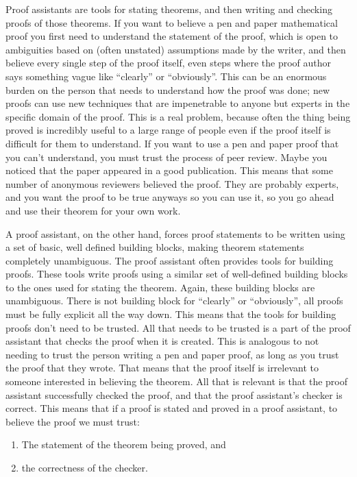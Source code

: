 \documentclass{puthesis}
\begin{document}
Proof assistants are tools for stating theorems, and then writing and
checking proofs of those theorems. If you want to believe a pen and
paper mathematical proof you first need to understand the statement of
the proof, which is open to ambiguities based on (often unstated)
assumptions made by the writer, and then believe every single step of
the proof itself, even steps where the proof author says something
vague like ``clearly'' or ``obviously''. This can be an enormous
burden on the person that needs to understand how the proof was done;
new proofs can use new techniques that are impenetrable to anyone but
experts in the specific domain of the proof. This is a real problem,
because often the thing being proved is incredibly useful to a large
range of people even if the proof itself is difficult for them to
understand. If you want to use a pen and paper proof that you can't
understand, you must trust the process of peer review. Maybe you
noticed that the paper appeared in a good publication. This means that
some number of anonymous reviewers believed the proof. They are
probably experts, and you want the proof to be true anyways so you can
use it, so you go ahead and use their theorem for your own work.

A proof assistant, on the other hand, forces proof statements to be
written using a set of basic, well defined building blocks, making
theorem statements completely unambiguous. The proof assistant often
provides tools for building proofs. These tools write proofs using a
similar set of well-defined building blocks to the ones used for
stating the theorem. Again, these building blocks are
unambiguous. There is not building block for ``clearly'' or
``obviously'', all proofs must be fully explicit all the way down.
This means that the tools for building proofs don't need to be
trusted. All that needs to be trusted is a part of the proof assistant
that checks the proof when it is created. This is analogous to not
needing to trust the person writing a pen and paper proof, as long as
you trust the proof that they wrote. That means that the proof itself
is irrelevant to someone interested in believing the theorem. All
that is relevant is that the proof assistant successfully checked the
proof, and that the proof assistant's checker is correct. This means
that if a proof is stated and proved in a proof assistant, to believe
the proof we must trust:

\begin{enumerate}
  \item The statement of the theorem being proved, and
  \item the correctness of the checker. 
\end{enumerate}
\end{document}
